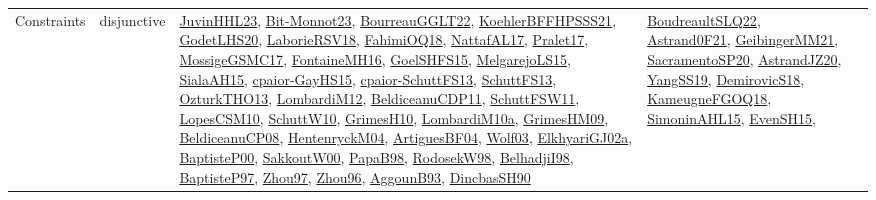 {\begin{longtable}{lp{3cm}>{\raggedright}p{6cm}>{\raggedright}p{6cm}p{8cm}}
Constraints & disjunctive & \href{papers/JuvinHHL23.pdf}{JuvinHHL23}\cite{JuvinHHL23}, \href{papers/Bit-Monnot23.pdf}{Bit-Monnot23}\cite{Bit-Monnot23}, \href{articles/BourreauGGLT22.pdf}{BourreauGGLT22}\cite{BourreauGGLT22}, \href{articles/KoehlerBFFHPSSS21.pdf}{KoehlerBFFHPSSS21}\cite{KoehlerBFFHPSSS21}, \href{papers/GodetLHS20.pdf}{GodetLHS20}\cite{GodetLHS20}, \href{articles/LaborieRSV18.pdf}{LaborieRSV18}\cite{LaborieRSV18}, \href{articles/FahimiOQ18.pdf}{FahimiOQ18}\cite{FahimiOQ18}, \href{articles/NattafAL17.pdf}{NattafAL17}\cite{NattafAL17}, \href{papers/Pralet17.pdf}{Pralet17}\cite{Pralet17}, \href{papers/MossigeGSMC17.pdf}{MossigeGSMC17}\cite{MossigeGSMC17}, \href{papers/FontaineMH16.pdf}{FontaineMH16}\cite{FontaineMH16}, \href{articles/GoelSHFS15.pdf}{GoelSHFS15}\cite{GoelSHFS15}, \href{papers/MelgarejoLS15.pdf}{MelgarejoLS15}\cite{MelgarejoLS15}, \href{papers/SialaAH15.pdf}{SialaAH15}\cite{SialaAH15}, \href{papers/cpaior-GayHS15.pdf}{cpaior-GayHS15}\cite{cpaior-GayHS15}, \href{papers/cpaior-SchuttFS13.pdf}{cpaior-SchuttFS13}\cite{cpaior-SchuttFS13}, \href{papers/SchuttFS13.pdf}{SchuttFS13}\cite{SchuttFS13}, \href{articles/OzturkTHO13.pdf}{OzturkTHO13}\cite{OzturkTHO13}, \href{articles/LombardiM12.pdf}{LombardiM12}\cite{LombardiM12}, \href{articles/BeldiceanuCDP11.pdf}{BeldiceanuCDP11}\cite{BeldiceanuCDP11}, \href{articles/SchuttFSW11.pdf}{SchuttFSW11}\cite{SchuttFSW11}, \href{articles/LopesCSM10.pdf}{LopesCSM10}\cite{LopesCSM10}, \href{papers/SchuttW10.pdf}{SchuttW10}\cite{SchuttW10}, \href{papers/GrimesH10.pdf}{GrimesH10}\cite{GrimesH10}, \href{articles/LombardiM10a.pdf}{LombardiM10a}\cite{LombardiM10a}, \href{papers/GrimesHM09.pdf}{GrimesHM09}\cite{GrimesHM09}, \href{papers/BeldiceanuCP08.pdf}{BeldiceanuCP08}\cite{BeldiceanuCP08}, \href{papers/HentenryckM04.pdf}{HentenryckM04}\cite{HentenryckM04}, \href{papers/ArtiguesBF04.pdf}{ArtiguesBF04}\cite{ArtiguesBF04}, \href{papers/Wolf03.pdf}{Wolf03}\cite{Wolf03}, \href{papers/ElkhyariGJ02a.pdf}{ElkhyariGJ02a}\cite{ElkhyariGJ02a}, \href{articles/BaptisteP00.pdf}{BaptisteP00}\cite{BaptisteP00}, \href{articles/SakkoutW00.pdf}{SakkoutW00}\cite{SakkoutW00}, \href{articles/PapaB98.pdf}{PapaB98}\cite{PapaB98}, \href{papers/RodosekW98.pdf}{RodosekW98}\cite{RodosekW98}, \href{articles/BelhadjiI98.pdf}{BelhadjiI98}\cite{BelhadjiI98}, \href{papers/BaptisteP97.pdf}{BaptisteP97}\cite{BaptisteP97}, \href{articles/Zhou97.pdf}{Zhou97}\cite{Zhou97}, \href{papers/Zhou96.pdf}{Zhou96}\cite{Zhou96}, \href{articles/AggounB93.pdf}{AggounB93}\cite{AggounB93}, \href{articles/DincbasSH90.pdf}{DincbasSH90}\cite{DincbasSH90} & \href{papers/BoudreaultSLQ22.pdf}{BoudreaultSLQ22}\cite{BoudreaultSLQ22}, \href{papers/Astrand0F21.pdf}{Astrand0F21}\cite{Astrand0F21}, \href{papers/GeibingerMM21.pdf}{GeibingerMM21}\cite{GeibingerMM21}, \href{articles/SacramentoSP20.pdf}{SacramentoSP20}\cite{SacramentoSP20}, \href{articles/AstrandJZ20.pdf}{AstrandJZ20}\cite{AstrandJZ20}, \href{papers/YangSS19.pdf}{YangSS19}\cite{YangSS19}, \href{papers/DemirovicS18.pdf}{DemirovicS18}\cite{DemirovicS18}, \href{papers/KameugneFGOQ18.pdf}{KameugneFGOQ18}\cite{KameugneFGOQ18}, \href{articles/SimoninAHL15.pdf}{SimoninAHL15}\cite{SimoninAHL15}, \href{papers/EvenSH15.pdf}{EvenSH15}\cite{EvenSH15}, 
\end{longtable}}
